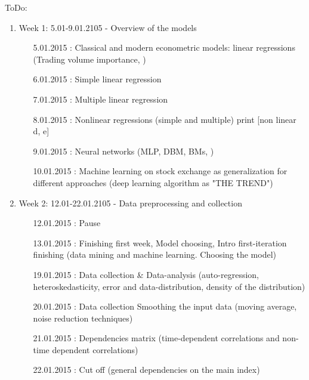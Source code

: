\documentclass {article}
\begin{document}
ToDo:
\begin{enumerate}
	\item Week 1: 5.01-9.01.2105 - Overview of the models 
	\begin{enumerate}
		\item[5.01.2015]: Classical and modern econometric models:  linear regressions (Trading volume importance, ) 
		\item[6.01.2015]: Simple linear regression 	 		  
		\item[7.01.2015]: Multiple linear regression  
		\item[8.01.2015]: Nonlinear regressions (simple and multiple) print [non linear d, e]  
		\item[9.01.2015]: Neural networks (MLP, DBM, BMs, )
		\item[10.01.2015]: Machine learning on stock exchange as generalization for different approaches (deep learning algorithm as "THE TREND") 
	\end{enumerate}
	\item Week 2: 12.01-22.01.2105 - Data preprocessing and collection
	\begin{enumerate}
		\item[12.01.2015]: Pause  
		\item[13.01.2015]: Finishing first week, Model choosing, Intro first-iteration finishing (data mining and machine learning. Choosing the model)  
		\item[19.01.2015]: Data collection  \& Data-analysis (auto-regression, heteroskedasticity, error and data-distribution, density of the distribution)
		\item[20.01.2015]: Data collection  
		Smoothing the input data (moving average, noise reduction techniques)
		\item[21.01.2015]: Dependencies matrix  (time-dependent correlations and non-time dependent correlations)
		\item[22.01.2015]: Cut off (general dependencies on the main index)
		

\end{enumerate}
\end{enumerate}
\end{document}
